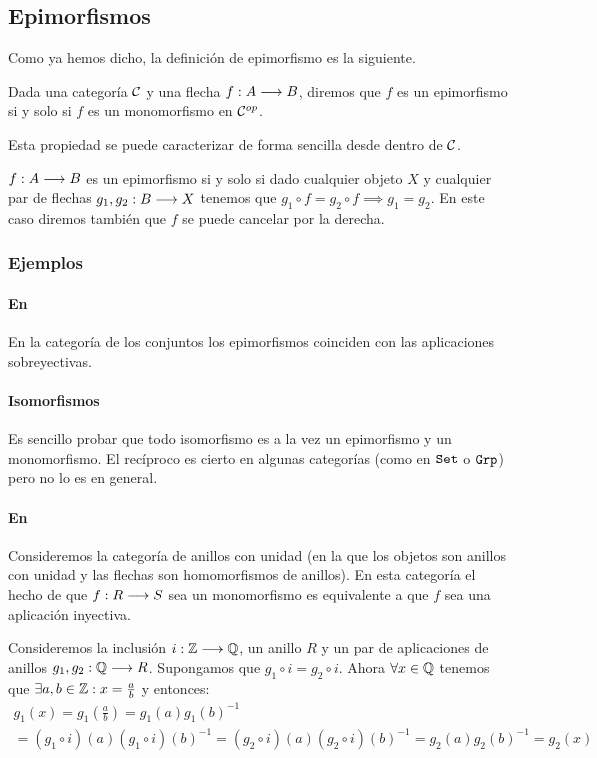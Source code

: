 \subsection{Epimorfismos}
Como ya hemos dicho, la definición de epimorfismo es la siguiente.
\begin{definition}
Dada una categoría $\mathcal{C}$ y una flecha $f: A\longrightarrow B$, diremos que
$f$ es un epimorfismo si y solo si $f$ es un monomorfismo en
$\mathcal{C}^{op}$.
\end{definition}
Esta propiedad
se puede caracterizar de forma sencilla desde dentro de $\mathcal{C}$.
\begin{proposition}
$f: A\longrightarrow B$ es un epimorfismo si y solo si dado cualquier objeto $X$ y
cualquier par de flechas $g_1, g_2 : B\longrightarrow X$
tenemos que $g_1 \circ f = g_2 \circ f \implies g_1 = g_2$.
En este caso diremos también que $f$ se puede cancelar por la
derecha.
\end{proposition}

\subsubsection{Ejemplos}
\paragraph{En \Set}
En la categoría de los conjuntos los epimorfismos coinciden con las
aplicaciones sobreyectivas.

\paragraph{Isomorfismos}
Es sencillo probar que todo isomorfismo es a la vez
un epimorfismo y un monomorfismo.
El recíproco
es cierto en algunas categorías (como en $\texttt{Set}$ o $\texttt{Grp}$) pero no
lo es en general.

\paragraph{En \Ring}
Consideremos la categoría de anillos con unidad (en la
que los objetos son anillos con unidad y
las flechas son homomorfismos de anillos). En esta categoría
el hecho de que $f : R\longrightarrow S$ sea un monomorfismo
es equivalente a que $f$ sea una aplicación
inyectiva.

Consideremos la inclusión
$i : \mathbb{Z}\longrightarrow \mathbb{Q}$, un anillo $R$
y un par de aplicaciones de anillos $g_1, g_2 : \mathbb{Q}\longrightarrow R$. Supongamos
que $g_1 \circ i = g_2 \circ i$. Ahora  $\forall x \in \mathbb{Q}$
tenemos que $\exists a, b \in \mathbb{Z} : x = \frac{a}{b}$ y entonces:
\begin{multline*}
g_1(x) = g_1(\frac{a}{b}) = g_1(a)g_1(b)^{-1} \\
       = (g_1 \circ i)(a)(g_1\circ i)(b)^{-1}
       = (g_2\circ i)(a)(g_2\circ i)(b)^{-1}
       = g_2(a)g_2(b)^{-1} = g_2(x)
\end{multline*}

